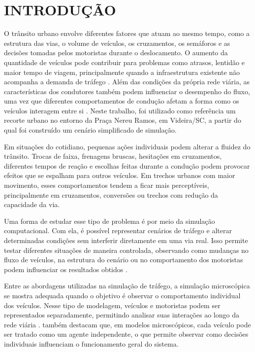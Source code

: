 \chapter{INTRODUÇÃO}

O trânsito urbano envolve diferentes fatores que atuam ao mesmo tempo, como a estrutura das vias, o volume de veículos, os cruzamentos, os semáforos e as decisões tomadas pelos motoristas durante o deslocamento. O aumento da quantidade de veículos pode contribuir para problemas como atrasos, lentidão e maior tempo de viagem, principalmente quando a infraestrutura existente não acompanha a demanda de tráfego \cite{dorokhin_2020}. Além das condições da própria rede viária, as características dos condutores também podem influenciar o desempenho do fluxo, uma vez que diferentes comportamentos de condução afetam a forma como os veículos interagem entre si \cite{zhai_2021}. Neste trabalho, foi utilizado como referência um recorte urbano no entorno da Praça Nereu Ramos, em Videira/SC, a partir do qual foi construído um cenário simplificado de simulação.

Em situações do cotidiano, pequenas ações individuais podem alterar a fluidez do trânsito. Trocas de faixa, frenagens bruscas, hesitações em cruzamentos, diferentes tempos de reação e escolhas feitas durante a condução podem provocar efeitos que se espalham para outros veículos. Em trechos urbanos com maior movimento, esses comportamentos tendem a ficar mais perceptíveis, principalmente em cruzamentos, conversões ou trechos com redução da capacidade da via.

Uma forma de estudar esse tipo de problema é por meio da simulação computacional. Com ela, é possível representar cenários de tráfego e alterar determinadas condições sem interferir diretamente em uma via real. Isso permite testar diferentes situações de maneira controlada, observando como mudanças no fluxo de veículos, na estrutura do cenário ou no comportamento dos motoristas podem influenciar os resultados obtidos \cite{dorokhin_2020}.

Entre as abordagens utilizadas na simulação de tráfego, a simulação microscópica se mostra adequada quando o objetivo é observar o comportamento individual dos veículos. Nesse tipo de modelagem, veículos e motoristas podem ser representados separadamente, permitindo analisar suas interações ao longo da rede viária \cite{brambila_2008}.  também destacam que, em modelos microscópicos, cada veículo pode ser tratado como um agente independente, o que permite observar como decisões individuais influenciam o funcionamento geral do sistema.

